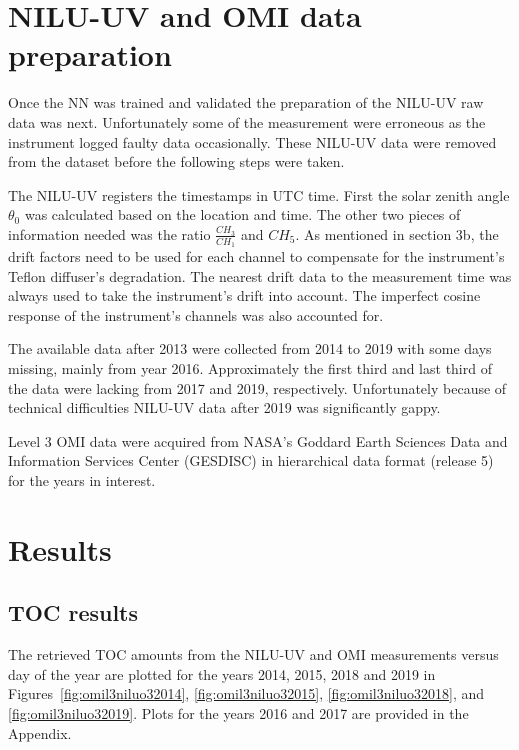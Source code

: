 \documentclass{optica-article}
\begin{document}

\section{NILU-UV and OMI data preparation}
\label{sec-dataprep}

Once the NN was trained and validated the preparation of the NILU-UV raw data was next.  
Unfortunately some of the measurement were erroneous as the instrument logged faulty data occasionally.
These NILU-UV data were removed from the dataset before the following steps were taken.

The NILU-UV registers the timestamps in UTC time.
First the solar zenith angle $\theta_0$ was calculated based on the location and time. 
The other two pieces of information needed was the ratio $\frac{CH_3}{CH_1}$ and $CH_5$.
As mentioned in \cite{Sztipanov:20} section 3b, the drift factors need to be used for each channel to compensate for the instrument's Teflon diffuser's degradation. 
The nearest drift data to the measurement time was always used to take the instrument's drift into account.
The imperfect cosine response of the instrument's channels was also accounted for.

The available data after 2013 were collected from 2014 to 2019 with some days missing, mainly from year 2016.
Approximately the first third and last third of the data were lacking from 2017 and 2019, respectively.
Unfortunately because of technical difficulties NILU-UV data after 2019 was significantly gappy. 

Level 3 OMI data were acquired from NASA's Goddard Earth Sciences Data and Information Services Center (GESDISC) in hierarchical data format (release 5) for the years in interest.

\section{Results}
\label{sec-results}

\subsection{TOC results}

The retrieved TOC amounts from the NILU-UV and OMI measurements versus day of the year are plotted for the years 2014, 2015, 2018 and 2019 in Figures~\ref{fig:omil3niluo32014}, \ref{fig:omil3niluo32015}, \ref{fig:omil3niluo32018}, and \ref{fig:omil3niluo32019}. 
Plots for the years 2016 and 2017 are provided in the Appendix.
\end{document}
